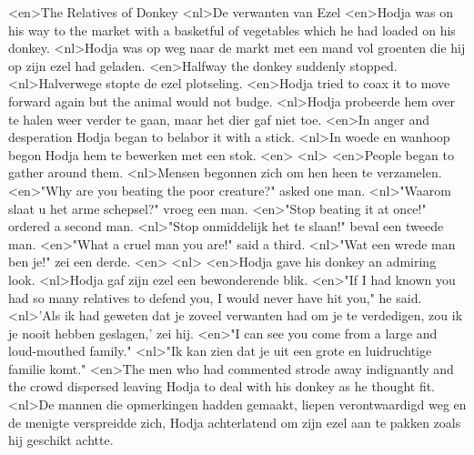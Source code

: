 <en>The Relatives of Donkey
<nl>De verwanten van Ezel
<en>Hodja was on his way to the market with a basketful of vegetables which he had loaded on his donkey.
<nl>Hodja was op weg naar de markt met een mand vol groenten die hij op zijn ezel had geladen.
<en>Halfway the donkey suddenly stopped.
<nl>Halverwege stopte de ezel plotseling.
<en>Hodja tried to coax it to move forward again but the animal would not budge.
<nl>Hodja probeerde hem over te halen weer verder te gaan, maar het dier gaf niet toe.
<en>In anger and desperation Hodja began to belabor it with a stick.
<nl>In woede en wanhoop begon Hodja hem te bewerken met een stok.
<en>
<nl>
<en>People began to gather around them.
<nl>Mensen begonnen zich om hen heen te verzamelen.
<en>"Why are you beating the poor creature?" asked one man.
<nl>"Waarom slaat u het arme schepsel?" vroeg een man.
<en>"Stop beating it at once!" ordered a second man.
<nl>"Stop onmiddelijk het te slaan!" beval een tweede man.
<en>"What a cruel man you are!" said a third.
<nl>"Wat een wrede man ben je!" zei een derde.
<en>
<nl>
<en>Hodja gave his donkey an admiring look.
<nl>Hodja gaf zijn ezel een bewonderende blik.
<en>"If I had known you had so many relatives to defend you, I would never have hit you," he said.
<nl>'Als ik had geweten dat je zoveel verwanten had om je te verdedigen, zou ik je nooit hebben geslagen,' zei hij.
<en>"I can see you come from a large and loud-mouthed family."
<nl>"Ik kan  zien dat je uit een grote en luidruchtige familie komt."
<en>The men who had commented strode away indignantly and the crowd dispersed leaving Hodja to deal with his donkey as he thought fit.
<nl>De mannen die opmerkingen hadden gemaakt, liepen verontwaardigd weg en de menigte verspreidde zich,  Hodja  achterlatend om zijn ezel aan te pakken zoals hij  geschikt achtte.
